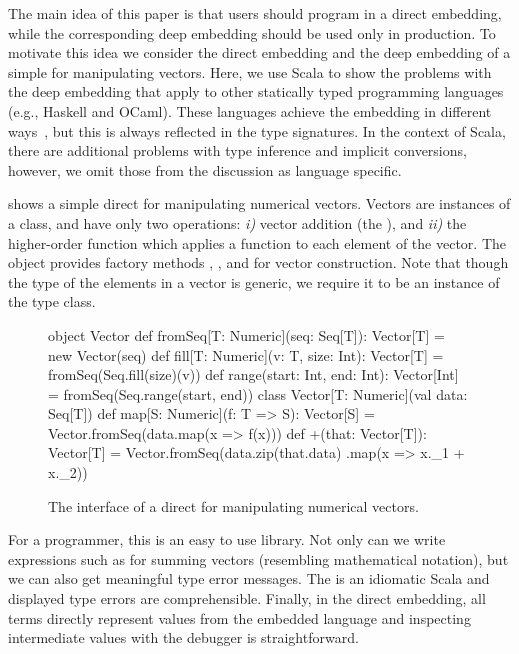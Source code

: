 The main idea of this paper is that \edsl{} users should program in a
direct embedding, while the corresponding deep embedding should be used only in production.
To motivate this idea we consider the direct embedding and the deep embedding of a simple \edsl for manipulating vectors. Here, we use Scala to show the problems with the deep embedding that apply to other statically typed programming languages (e.g., Haskell and OCaml). These languages achieve the embedding in different ways~\cite{svenningsson_combining_2012,awesome,carette_finally_2009,guerrero_implementing_2004}, but this is always reflected in the type signatures. In the context of Scala, there are additional problems with type inference and implicit conversions, however, we omit those from the discussion as language specific.

 shows a simple direct \edsl{} for manipulating numerical vectors.
Vectors are instances of a  class, and have only two operations:
\emph{i)} vector addition (the \code{+}), and \emph{ii)} the higher-order  function which applies a function  to each element of the vector. The  object provides factory methods , , and  for vector construction. Note that though the type of the elements in a vector is generic, we require it to be an instance of the  type class.

\begin{figure}
\begin{listingtiny}
object Vector {
  def fromSeq[T: Numeric](seq: Seq[T]): Vector[T] =
    new Vector(seq)
  def fill[T: Numeric](v: T, size: Int): Vector[T] =
    fromSeq(Seq.fill(size)(v))
  def range(start: Int, end: Int): Vector[Int] =
    fromSeq(Seq.range(start, end))
}
class Vector[T: Numeric](val data: Seq[T]) {
  def map[S: Numeric](f: T => S): Vector[S] =
    Vector.fromSeq(data.map(x => f(x)))
  def +(that: Vector[T]): Vector[T] =
    Vector.fromSeq(data.zip(that.data)
      .map(x => x._1 + x._2))
}

\end{listingtiny}
\caption{\label{lst:vector} The interface of a direct \edsl for manipulating numerical vectors.}
\end{figure}

For a programmer, this is an easy to use library. Not only can we write
expressions such as  for summing vectors (resembling mathematical
notation), but we can also get meaningful type error messages. The \edsl is an
idiomatic Scala and displayed type errors are comprehensible. Finally, in the
direct embedding, all terms directly represent values from the embedded language
and inspecting intermediate values with the debugger is straightforward.

